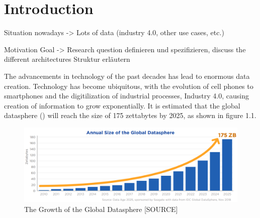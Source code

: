 \chapter{Introduction}
\label{cha:Introduction} %
Situation nowadays -> Lots of data (industry 4.0, other use cases, etc.)

Motivation
Goal -> Research question definieren und spezifizieren, discuss the different architectures
Struktur erläutern


The advancements in technology of the past decades has lead to enormous data creation. Technology has become ubiquitous, with the evolution of cell phones to smartphones 
and the digitilization of industrial processes, Industry 4.0, causing creation of information to grow exponentially.
It is estimated that the global datasphere () will reach the size of 175 zettabytes by 2025, as shown in figure 1.1.
\begin{figure}[ht]
\centering
\includegraphics[width=1.0\textwidth]{Bilder/size_global_datasphere.png}
\caption{The Growth of the Global Datasphere [SOURCE]}
\label{fig:growth_datasphere}
\end{figure}

